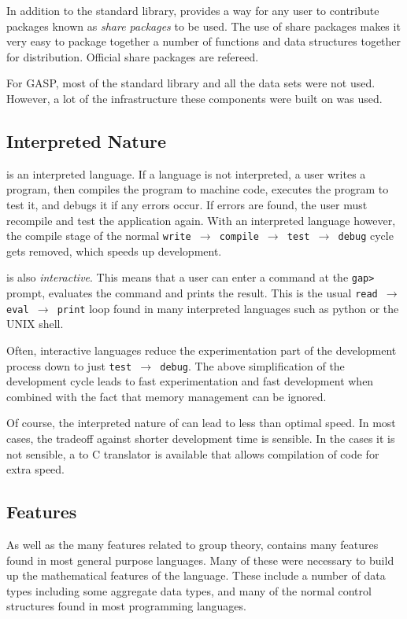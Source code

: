 In addition to the standard library, \GAP{} provides a way for any
user to contribute packages known as \emph{share packages} to be used.
The use of share packages makes it very easy to package together a
number of functions and data structures together for distribution.
Official share packages are refereed.

For GASP, most of the standard library and all the data sets were not
used.  However, a lot of the infrastructure these components were
built on was used.


\subsection{Interpreted Nature}

\GAP{} is an interpreted language.  If a language is not interpreted,
a user writes a program, then compiles the program to machine code,
executes the program to test it, and debugs it if any errors occur.
If errors are found, the user must recompile and test the application
again.  With an interpreted language however, the compile stage of the
normal \texttt{write $\to$ compile $\to$ test $\to$ debug} cycle gets
removed, which speeds up development.

\GAP{} is also \emph{interactive}. This means that a user can enter
a command at the \texttt{gap>} prompt, \GAP{} evaluates the command
and prints the result.  This is the usual \texttt{read $\to$ eval
$\to$ print} loop found in many interpreted languages such as python
or the UNIX shell.

Often, interactive languages reduce the experimentation part of the
development process down to just \texttt{test $\to$ debug}.  The above
simplification of the development cycle leads to fast experimentation
and fast development when combined with the fact that memory
management can be ignored.

Of course, the interpreted nature of \GAP{} can lead to less than
optimal speed.  In most cases, the tradeoff against shorter
development time is sensible.  In the cases it is not sensible, a
\GAP{} to C translator is available that allows compilation of \GAP{}
code for extra speed.


\subsection{\GAP{} Features}

As well as the many features related to group theory, \GAP{} contains
many features found in most general purpose languages.  Many of these
were necessary to build up the mathematical features of the language.
These include a number of data types including some aggregate data
types, and many of the normal control structures found in most
programming languages.


